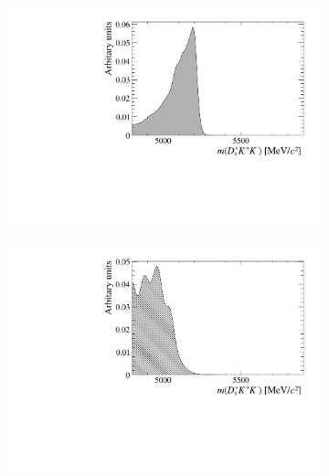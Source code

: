 \begin{figure}[!h]
    \centering
    \begin{subfigure}[t]{0.49\textwidth}
        \includegraphics[width=1.0\textwidth]{figs/B2DsKK/Bs2Dsa1_4800_5900_Shape.pdf}
        \caption{\decay{\Bsb}{\Dsp\Km\Kstarz} }
    \end{subfigure}
    \begin{subfigure}[t]{0.49\textwidth}
        \includegraphics[width=1.0\textwidth]{figs/B2DsKK/Bs2DsstKKst_4800_5900_Shape.pdf}
        \caption{\decay{\Bsb}{\Dssp\Km\Kstarz}}
    \end{subfigure}
    \begin{subfigure}[t]{0.49\textwidth}

\end{subfigure}
\end{figure}
